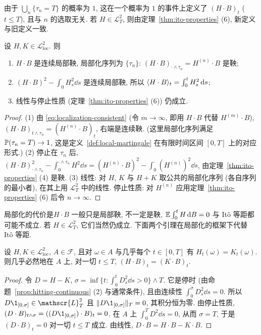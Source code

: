 由于 $\bigcup_n\{\tau_n=T\}$ 的概率为 $1$, 这在一个概率为 $1$ 的事件上定义了 $(H\cdot B)_t$ ($t\le T$), 且与 $n$ 的选取无关. 若 $H\in\mathscr{L}^2_T$, 则由定理~\ref{thm:ito-properties} (6), 新定义与旧定义一致.

\begin{theorem}\label{thm:ito-local}
设 $H,K\in\mathscr{L}^2_{\mathrm{loc}}$. 则
\begin{enumerate}
\item $H\cdot B$ 是连续局部鞅, 局部化序列为 $\{\tau_n\}$: $(H\cdot B)_{\cdot\wedge\tau_n}=H^{(n)}\cdot B$ 是鞅;
\item $(H\cdot B)^2-\int_0^\cdot H_s^2\dd s$ 是连续局部鞅, 所以 $\ip{H\cdot B}_t=\int_0^tH_s^2\dd s$;
\item 线性与停止性质 (定理~\ref{thm:ito-properties} (6)) 仍成立.
\end{enumerate}
\end{theorem}

\begin{proof}
(1) 由 \eqref{eq:localization-consistent} (令 $m\to\infty$, 即用 $H\cdot B$ 代替 $H^{(m)}\cdot B$), $(H\cdot B)_{t\wedge\tau_n}=(H^{(n)}\cdot B)_t$, 右端是连续鞅. (这里局部化序列满足 $\P(\tau_n=T)\to1$, 这是定义~\ref{def:local-martingale} 在有限时间区间 $[0,T]$ 上的对应形式.) (2) 停止在 $\tau_n$ 后, $(H\cdot B)^2_{\cdot\wedge\tau_n}-\int_0^{\cdot\wedge\tau_n}H^2\dd s=(H^{(n)}\cdot B)^2-\int_0^\cdot(H^{(n)})^2\dd s$, 由定理~\ref{thm:ito-properties} (4) 是鞅. (3) 线性: 对 $H$, $K$ 与 $H+K$ 取公共的局部化序列 (各自序列的最小者), 在其上用 $\mathscr{L}^2_T$ 中的线性. 停止性质: 对 $H^{(n)}$ 应用定理~\ref{thm:ito-properties} (6) 后令 $n\to\infty$.
\end{proof}

局部化的代价是$H\cdot B$ 一般只是局部鞅, 不一定是鞅, $\E\int_0^tH\dd B=0$ 与 It\^o 等距都可能不成立. 若 $H\in\mathscr{L}^2_T$, 它们当然仍成立. 下面两个引理在局部化的框架下代替 It\^o 等距.

\begin{lemma}[局部性]\label{lem:locality}
设 $H,K\in\mathscr{L}^2_{\mathrm{loc}}$, $A\in\mathcal{F}$, 且对 $\omega\in A$ 与几乎每个 $t\in[0,T]$ 有 $H_t(\omega)=K_t(\omega)$. 则几乎必然地在 $A$ 上, 对一切 $t\le T$, $(H\cdot B)_t=(K\cdot B)_t$.
\end{lemma}

\begin{proof}
令 $D=H-K$, $\sigma=\inf\{t: \int_0^tD_s^2\dd s>0\}\wedge T$. 它是停时 (由命题~\ref{prop:hitting-continuous} (2) 与通常条件), 且由连续性 $\int_0^\sigma D_s^2\dd s=0$. 所以 $D\1_{[0,\sigma]}\in\mathscr{L}^2_T$ 且 $\norm{D\1_{[0,\sigma]}}_T=0$, 其积分恒为零. 由停止性质, $(D\cdot B)_{t\wedge\sigma}=((D\1_{[0,\sigma]})\cdot B)_t=0$. 在 $A$ 上 $\int_0^TD^2\dd s=0$, 从而 $\sigma=T$, 于是 $(D\cdot B)_t=0$ 对一切 $t\le T$ 成立. 由线性, $D\cdot B=H\cdot B-K\cdot B$.
\end{proof}

